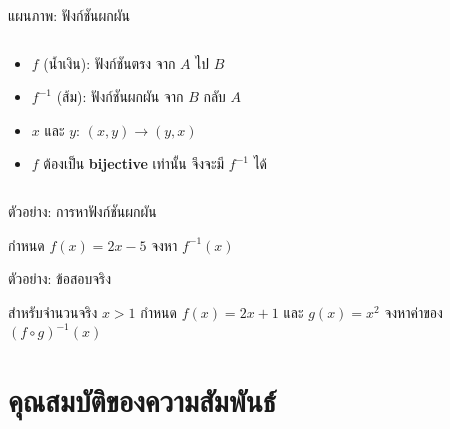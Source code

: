 \documentclass[11pt, aspectratio=169]{beamer}
\begin{document}
\begin{frame}{แผนภาพ: ฟังก์ชันผกผัน}
\begin{columns}[T]
      \begin{intuition}[หลักการ]
        \begin{itemize}
          \item $f$ (นํ้าเงิน): ฟังก์ชันตรง จาก $A$ ไป $B$
          \item $f^{-1}$ (ส้ม): ฟังก์ชันผกผัน จาก $B$ กลับ $A$
          \item {} $x$ และ $y$: $(x,y) \to (y,x)$
          \item $f$ ต้องเป็น \textbf{bijective} เท่านั้น จึงจะมี $f^{-1}$ ได้
        \end{itemize}
      \end{intuition}
  \end{columns}
\end{frame}\begin{frame}[t]{ตัวอย่าง: การหาฟังก์ชันผกผัน}
  \begin{exambox}[โจทย์]
    กำหนด $f(x) = 2x - 5$ จงหา $f^{-1}(x)$
  \end{exambox}

  \vspace{\fill}

\end{frame}\begin{frame}[t]{ตัวอย่าง: ข้อสอบจริง}
  \begin{exambox}[โจทย์ปี 67 ข้อ 5]
    สำหรับจำนวนจริง $x>1$ กำหนด $f(x)=2x+1$ และ $g(x)=x^2$ จงหาค่าของ $(f\circ g)^{-1}(x)$
  \end{exambox}

  \vspace{\fill}

\end{frame}

\section{คุณสมบัติของความสัมพันธ์}
\end{document}
